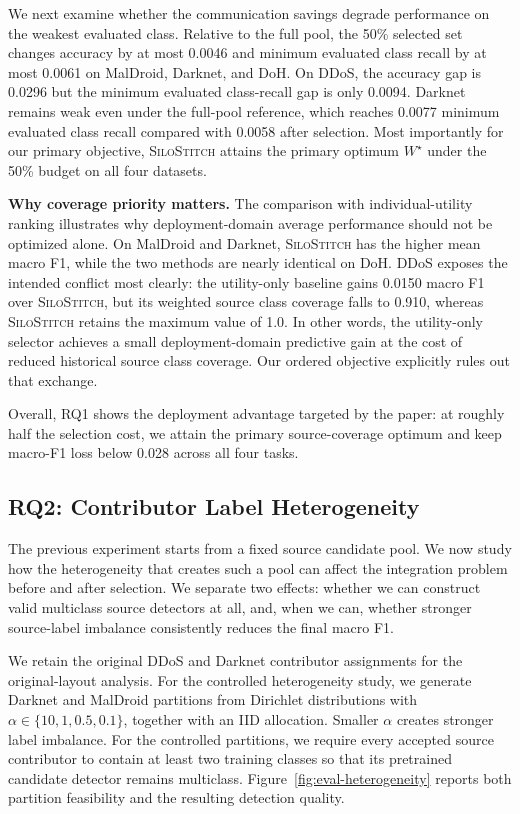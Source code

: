 \documentclass[conference]{IEEEtran}
\theoremstyle{definition}
\newcommand{\Fname}{\textsc{SiloStitch}\xspace}
\newcommand{\bheading}[1]{\noindent\textbf{#1.}\xspace}
\begin{document}
We next examine whether the communication savings degrade performance on the weakest evaluated class.
Relative to the full pool, the 50\% selected set changes accuracy by at most 0.0046 and minimum evaluated class recall by at most 0.0061 on MalDroid, Darknet, and DoH.
On DDoS, the accuracy gap is 0.0296 but the minimum evaluated class-recall gap is only 0.0094.
Darknet remains weak even under the full-pool reference, which reaches 0.0077 minimum evaluated class recall compared with 0.0058 after selection.
Most importantly for our primary objective, \Fname attains the primary optimum $W^\star$ under the 50\% budget on all four datasets.

\bheading{Why coverage priority matters}
The comparison with individual-utility ranking illustrates why deployment-domain average performance should not be optimized alone.
On MalDroid and Darknet, \Fname has the higher mean macro F1, while the two methods are nearly identical on DoH.
DDoS exposes the intended conflict most clearly: the utility-only baseline gains 0.0150 macro F1 over \Fname, but its weighted source class coverage falls to 0.910, whereas \Fname retains the maximum value of 1.0.
In other words, the utility-only selector achieves a small deployment-domain predictive gain at the cost of reduced historical source class coverage.
Our ordered objective explicitly rules out that exchange.

Overall, RQ1 shows the deployment advantage targeted by the paper: at roughly half the selection cost, we attain the primary source-coverage optimum and keep macro-F1 loss below 0.028 across all four tasks.

\subsection{RQ2: Contributor Label Heterogeneity}

The previous experiment starts from a fixed source candidate pool.
We now study how the heterogeneity that creates such a pool can affect the integration problem before and after selection.
We separate two effects: whether we can construct valid multiclass source detectors at all, and, when we can, whether stronger source-label imbalance consistently reduces the final macro F1.

We retain the original DDoS and Darknet contributor assignments for the original-layout analysis. For the controlled heterogeneity study, we generate Darknet and MalDroid partitions from Dirichlet distributions with $\alpha\in\{10,1,0.5,0.1\}$, together with an IID allocation.
Smaller $\alpha$ creates stronger label imbalance.
For the controlled partitions, we require every accepted source contributor to contain at least two training classes so that its pretrained candidate detector remains multiclass.
Figure~\ref{fig:eval-heterogeneity} reports both partition feasibility and the resulting detection quality.
\end{document}
